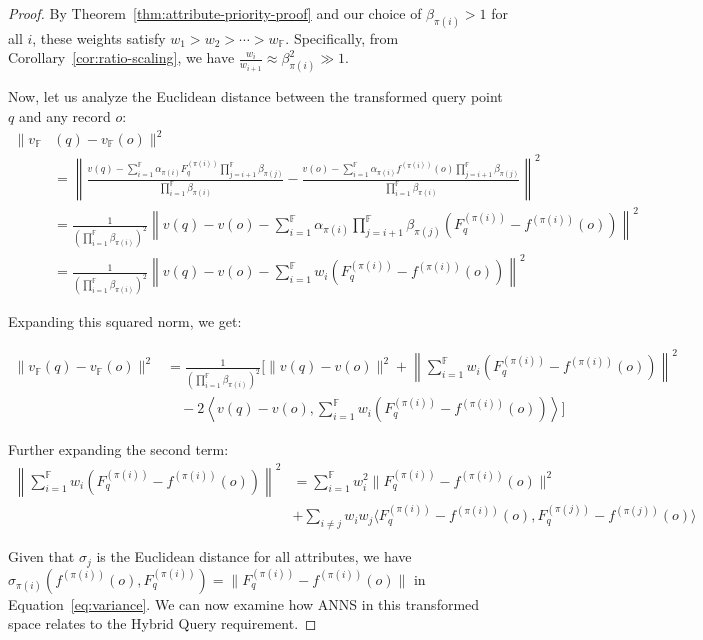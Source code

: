 \documentclass[numbers,sort]{article}
\begin{document}
\begin{proof}
By Theorem~\ref{thm:attribute-priority-proof} and our choice of $\beta_{\pi(i)} > 1$ for all $i$, these weights satisfy $w_1 > w_2 > \cdots > w_{\mathbb{F}}$. Specifically, from Corollary~\ref{cor:ratio-scaling}, we have $\frac{w_i}{w_{i+1}} \approx \beta_{\pi(i)}^2 \gg 1$.

Now, let us analyze the Euclidean distance between the transformed query point $q$ and any record $o$:
\begin{align}
\|v_{\mathbb{F}}&(q) - v_{\mathbb{F}}(o)\|^2 \\&= \left\|\frac{v(q) - \sum_{i=1}^{\mathbb{F}} \alpha_{\pi(i)} F^{(\pi(i))}_q \prod_{j=i+1}^{\mathbb{F}} \beta_{\pi(j)}}{\prod_{i=1}^{\mathbb{F}} \beta_{\pi(i)}} - \frac{v(o) - \sum_{i=1}^{\mathbb{F}} \alpha_{\pi(i)} f^{(\pi(i))}(o) \prod_{j=i+1}^{\mathbb{F}} \beta_{\pi(j)}}{\prod_{i=1}^{\mathbb{F}} \beta_{\pi(i)}}\right\|^2 \\
&= \frac{1}{(\prod_{i=1}^{\mathbb{F}} \beta_{\pi(i)})^2} \left\|v(q) - v(o) - \sum_{i=1}^{\mathbb{F}} \alpha_{\pi(i)} \prod_{j=i+1}^{\mathbb{F}} \beta_{\pi(j)} (F^{(\pi(i))}_q - f^{(\pi(i))}(o))\right\|^2 \\
&= \frac{1}{(\prod_{i=1}^{\mathbb{F}} \beta_{\pi(i)})^2} \left\|v(q) - v(o) - \sum_{i=1}^{\mathbb{F}} w_i (F^{(\pi(i))}_q - f^{(\pi(i))}(o))\right\|^2
\end{align}

Expanding this squared norm, we get:

\begin{align}
\|v_{\mathbb{F}}(q) - v_{\mathbb{F}}(o)\|^2 &= \frac{1}{(\prod_{i=1}^{\mathbb{F}} \beta_{\pi(i)})^2} \Big[\|v(q) - v(o)\|^2 + \left\|\sum_{i=1}^{\mathbb{F}} w_i (F^{(\pi(i))}_q - f^{(\pi(i))}(o))\right\|^2 \\
&\quad - 2 \left\langle v(q) - v(o), \sum_{i=1}^{\mathbb{F}} w_i (F^{(\pi(i))}_q - f^{(\pi(i))}(o)) \right\rangle \Big]
\end{align}

Further expanding the second term:
\begin{align}
\left\|\sum_{i=1}^{\mathbb{F}} w_i (F^{(\pi(i))}_q - f^{(\pi(i))}(o))\right\|^2 &= \sum_{i=1}^{\mathbb{F}} w_i^2 \|F^{(\pi(i))}_q - f^{(\pi(i))}(o)\|^2 \\
&+ \sum_{i \neq j} w_i w_j \langle F^{(\pi(i))}_q - f^{(\pi(i))}(o), F^{(\pi(j))}_q - f^{(\pi(j))}(o) \rangle
\end{align}

Given that $\sigma_j$ is the Euclidean distance for all attributes, we have $\sigma_{\pi(i)}(f^{(\pi(i))}(o), F^{(\pi(i))}_q) = \|F^{(\pi(i))}_q - f^{(\pi(i))}(o)\|$ in Equation~\ref{eq:variance}. We can now examine how ANNS in this transformed space relates to the Hybrid Query requirement.


\end{proof}
\end{document}
